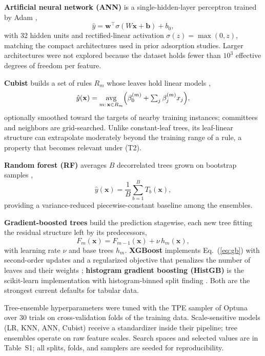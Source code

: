 \textbf{Artificial neural network (ANN)} is a single-hidden-layer
perceptron trained by Adam \citep{rumelhart1986backprop},
\begin{equation}
\hat{y} = \mathbf{w}^{\top} \sigma\!\left(W\mathbf{x} + \mathbf{b}\right) + b_0 ,
\label{eq:ann}
\end{equation}
with 32 hidden units and rectified-linear activation
$\sigma(z) = \max(0, z)$, matching the compact architectures used in
prior adsorption studies. Larger architectures were not explored because
the dataset holds fewer than $10^3$ effective degrees of freedom per
feature.

\textbf{Cubist} builds a set of rules $R_m$ whose leaves hold linear
models \citep{quinlan1992m5},
\begin{equation}
\hat{y}(\mathbf{x}) = \operatorname*{avg}_{m:\,\mathbf{x} \in R_m}
\Bigl( \beta_{0}^{(m)} + \textstyle\sum_j \beta_{j}^{(m)} x_j \Bigr),
\label{eq:cubist}
\end{equation}
optionally smoothed toward the targets of nearby training instances;
committees and neighbors are grid-searched. Unlike constant-leaf trees,
its leaf-linear structure can extrapolate moderately beyond the training
range of a rule, a property that becomes relevant under (T2).

\textbf{Random forest (RF)} averages $B$ decorrelated trees grown on
bootstrap samples \citep{breiman2001rf},
\begin{equation}
\hat{y}(\mathbf{x}) = \frac{1}{B}\sum_{b=1}^{B} T_b(\mathbf{x}),
\label{eq:rf}
\end{equation}
providing a variance-reduced piecewise-constant baseline among the
ensembles.

\textbf{Gradient-boosted trees} build the prediction stagewise, each new
tree fitting the residual structure left by its predecessors,
\begin{equation}
F_m(\mathbf{x}) = F_{m-1}(\mathbf{x}) + \nu\, h_m(\mathbf{x}),
\label{eq:gb}
\end{equation}
with learning rate $\nu$ and base trees $h_m$. \textbf{XGBoost}
implements Eq.~(\ref{eq:gb}) with second-order updates and a regularized
objective that penalizes the number of leaves and their weights
\citep{chen2016xgboost}; \textbf{histogram gradient boosting (HistGB)}
is the scikit-learn implementation with histogram-binned split finding
\citep{ke2017lightgbm, pedregosa2011sklearn}. Both are the strongest
current defaults for tabular data.

Tree-ensemble hyperparameters were tuned with the TPE sampler of Optuna
over 30 trials \citep{akiba2019optuna} on cross-validation folds of the
training data. Scale-sensitive models (LR, KNN, ANN, Cubist) receive a
standardizer inside their pipeline; tree ensembles operate on raw feature
scales. Search spaces and selected values are in Table~S1; all splits,
folds, and samplers are seeded for reproducibility.

